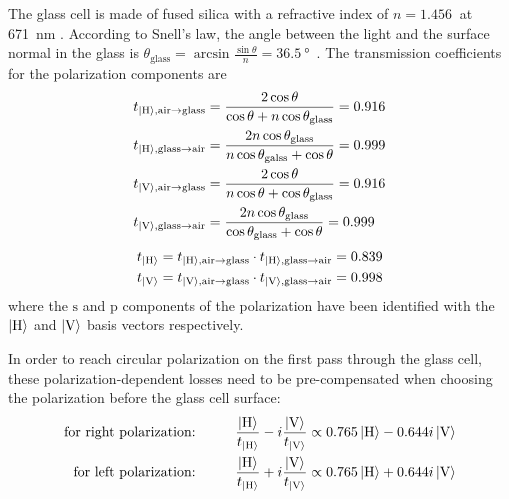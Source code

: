 The glass cell is made of fused silica with a refractive index of $n = \SI{1.456}{}$ at \SI{671}{\nano\meter} \cite{malitson_interspecimen_1965}. According to Snell's law, the angle between the light and the surface normal in the glass is $\theta_\text{glass} = \arcsin \frac{\sin \theta}{n} = \SI{36.5}{\degree}$~\cite{demtroder_elektromagnetische_2013}. The transmission coefficients for the polarization components are~\cite{demtroder_elektromagnetische_2013}
\begin{align}
    \begin{split}
        t_{\Ket{\text{H}}, \text{air} \rightarrow \text{glass}} &= \frac{2 \cos \theta}{\cos \theta + n \cos \theta_\text{glass}} =  \SI{0.916}{}\\
        t_{\Ket{\text{H}}, \text{glass} \rightarrow \text{air}} &= \frac{2n \cos \theta_\text{glass}}{n \cos \theta_\text{galss} + \cos \theta} = \SI{0.999}{} \\
        t_{\Ket{\text{V}}, \text{air} \rightarrow \text{glass}} &= \frac{2 \cos \theta}{n \cos \theta + \cos \theta_\text{glass}} = \SI{0.916}{}\\ 
        t_{\Ket{\text{V}}, \text{glass} \rightarrow \text{air}} &= \frac{2 n \cos \theta_\text{glass}}{\cos \theta_\text{glass} + \cos \theta} = \SI{0.999}{}\\ 
    \end{split}
\end{align}
\begin{align}
    \begin{split}
        t_{\Ket{\text{H}}} = t_{\Ket{\text{H}}, \text{air} \rightarrow \text{glass}}  \cdot t_{\Ket{\text{H}}, \text{glass} \rightarrow \text{air}} = \SI{0.839}{} \\
        t_{\Ket{\text{V}}} = t_{\Ket{\text{V}}, \text{air} \rightarrow \text{glass}}  \cdot t_{\Ket{\text{V}}, \text{glass} \rightarrow \text{air}} = \SI{0.998}{}
    \end{split}
\end{align}
where the $\text{s}$ and $\text{p}$ components of the polarization have been identified with the $\Ket{\text{H}}$ and $\Ket{\text{V}}$ basis vectors respectively.


In order to reach circular polarization on the first pass through the glass cell, these polarization-dependent losses need to be pre-compensated when choosing the polarization before the glass cell surface:
\begin{align}
    \label{eq:predicted_polarization_first_pass_right}
    \text{for right polarization:} \hspace{1cm} & \frac{\Ket{\text{H}}}{t_{\Ket{\text{H}}}} - i \frac{\Ket{\text{V}}}{t_{\Ket{\text{V}}}} \propto 0.765 \Ket{\text{H}} - 0.644i \Ket{\text{V}} \\
    \label{eq:predicted_polarization_first_pass_left}
    \text{for left polarization:} \hspace{1cm} & \frac{\Ket{\text{H}}}{t_{\Ket{\text{H}}}} + i \frac{\Ket{\text{V}}}{t_{\Ket{\text{V}}}} \propto 0.765 \Ket{\text{H}} + 0.644i \Ket{\text{V}}
\end{align}

